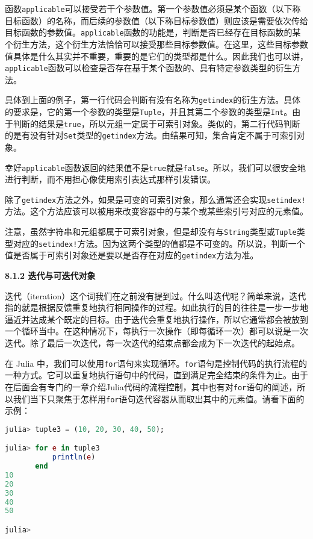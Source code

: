 函数\verb|applicable|可以接受若干个参数值。第一个参数值必须是某个函数（以下称目标函数）的名称，而后续的参数值（以下称目标参数值）则应该是需要依次传给目标函数的参数值。\verb|applicable|函数的功能是，判断是否已经存在目标函数的某个衍生方法，这个衍生方法恰恰可以接受那些目标参数值。在这里，这些目标参数值具体是什么其实并不重要，重要的是它们的类型都是什么。因此我们也可以讲，\verb|applicable|函数可以检查是否存在基于某个函数的、具有特定参数类型的衍生方法。

具体到上面的例子，第一行代码会判断有没有名称为\verb|getindex|的衍生方法。具体的要求是，它的第一个参数的类型是\verb|Tuple|，并且其第二个参数的类型是\verb|Int|。由于判断的结果是\verb|true|，所以元组一定属于可索引对象。类似的，第二行代码判断的是有没有针对\verb|Set|类型的\verb|getindex|方法。由结果可知，集合肯定不属于可索引对象。

幸好\verb|applicable|函数返回的结果值不是\verb|true|就是\verb|false|。所以，我们可以很安全地进行判断，而不用担心像使用索引表达式那样引发错误。

除了\verb|getindex|方法之外，如果是可变的可索引对象，那么通常还会实现\verb|setindex!|方法。这个方法应该可以被用来改变容器中的与某个或某些索引号对应的元素值。

注意，虽然字符串和元组都属于可索引对象，但是却没有与\verb|String|类型或\verb|Tuple|类型对应的\verb|setindex!|方法。因为这两个类型的值都是不可变的。所以说，判断一个值是否属于可索引对象还是要以是否存在对应的\verb|getindex|方法为准。

\textbf{8.1.2 迭代与可迭代对象}

迭代（iteration）这个词我们在之前没有提到过。什么叫迭代呢？简单来说，迭代指的就是根据反馈重复地执行相同操作的过程。如此执行的目的往往是一步一步地逼近并达成某个既定的目标。由于迭代会重复地执行操作，所以它通常都会被放到一个循环当中。在这种情况下，每执行一次操作（即每循环一次）都可以说是一次迭代。除了最后一次迭代，每一次迭代的结束点都会成为下一次迭代的起始点。

在 Julia 中，我们可以使用\verb|for|语句来实现循环。\verb|for|语句是控制代码的执行流程的一种方式。它可以重复地执行语句中的代码，直到满足完全结束的条件为止。由于在后面会有专门的一章介绍Julia代码的流程控制，其中也有对\verb|for|语句的阐述，所以我们当下只聚焦于怎样用\verb|for|语句迭代容器从而取出其中的元素值。请看下面的示例：
\begin{lstlisting}[language=julia]
julia> tuple3 = (10, 20, 30, 40, 50);

julia> for e in tuple3
           println(e)
       end
10
20
30
40
50

julia> 
\end{lstlisting}

